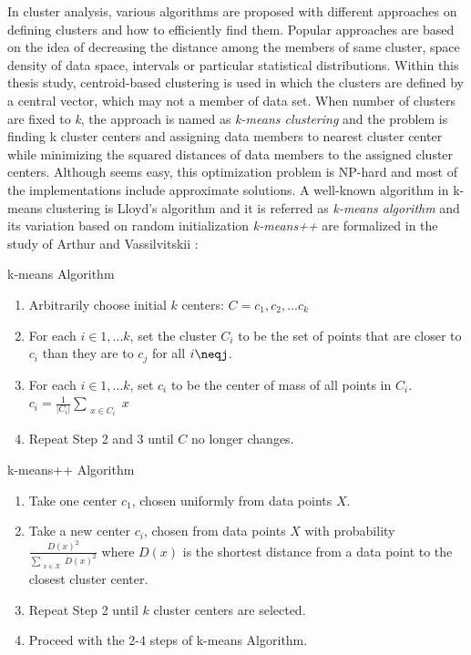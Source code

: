 In cluster analysis, various algorithms are proposed with different approaches on defining clusters and how to efficiently find them. Popular approaches are based on the idea of decreasing the distance among the members of same cluster, space density of data space, intervals or particular statistical distributions. Within this thesis study, centroid-based clustering is used in which the clusters are defined by a central vector, which may not a member of data set. When number of clusters are fixed to \textit{k}, the approach is named as \textit{k-means clustering} and the problem is finding k cluster centers and assigning data members to nearest cluster center while minimizing the squared distances of data members to the assigned cluster centers. Although seems easy, this optimization problem is NP-hard and most of the implementations include approximate solutions. A well-known algorithm in k-means clustering is Lloyd's algorithm and it is referred as \textit{k-means algorithm} and its variation based on random initialization \textit{k-means++} are formalized in the study of Arthur and Vassilvitskii \cite{arthur2007}: 
\theoremstyle{definition}
\begin{definition}{k-means Algorithm}
\begin{enumerate}
  \item Arbitrarily choose initial $k$ centers: $C={c_1,c_2,...c_k}$
  \item For each $i \in {1,...k}$, set the cluster $C_i$ to be the set of points that are closer to $c_i$ than they are to $c_j$ for all $i\neqj$.
  \item For each $i \in {1,...k}$, set $c_i$ to be the center of mass of all points in $C_i$. $c_i=\frac{1}{|C_i|} \sum_{\substack{x\in C_i}} x$
  \item Repeat Step 2 and 3 until $C$ no longer changes.
\end{enumerate}
\end{definition}
\theoremstyle{definition}
\begin{definition}{k-means++ Algorithm}
\begin{enumerate}
  \item Take one center $c_1$, chosen uniformly from data points $X$.
  \item Take a new center $c_i$, chosen from data points $X$ with probability $\frac{D(x)^2}{\sum_{\substack{x\in X}} D(x)^2}$ where $D(x)$ is the shortest distance from a data point to the closest cluster center.
  \item Repeat Step 2 until $k$ cluster centers are selected.
  \item Proceed with the 2-4 steps of k-means Algorithm.
\end{enumerate}
\end{definition}

